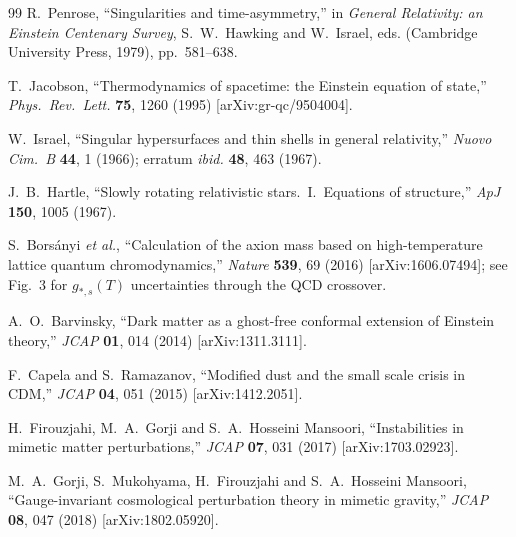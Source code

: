\documentclass[aps,prd,twocolumn,nofootinbib,floatfix,superscriptaddress]{revtex4-2}
\begin{document}
\begin{thebibliography}{99}
 R.~Penrose, ``Singularities and time-asymmetry,''
in \textit{General Relativity: an Einstein Centenary Survey},
S.~W.~Hawking and W.~Israel, eds. (Cambridge University Press, 1979),
pp.~581--638.

 T.~Jacobson, ``Thermodynamics of spacetime:
the Einstein equation of state,''
\textit{Phys.~Rev.~Lett.} \textbf{75}, 1260 (1995)
[arXiv:gr-qc/9504004].

 W.~Israel, ``Singular hypersurfaces and thin
shells in general relativity,''
\textit{Nuovo Cim.~B} \textbf{44}, 1 (1966); erratum
\textit{ibid.} \textbf{48}, 463 (1967).

 J.~B.~Hartle, ``Slowly rotating relativistic
stars.~I.~Equations of structure,''
\textit{ApJ} \textbf{150}, 1005 (1967).

 S.~Bors\'anyi \emph{et al.}, ``Calculation
of the axion mass based on high-temperature lattice quantum
chromodynamics,''
\textit{Nature} \textbf{539}, 69 (2016) [arXiv:1606.07494]; see
Fig.~3 for $g_{*,s}(T)$ uncertainties through the QCD crossover.

 A.~O.~Barvinsky, ``Dark matter as a
ghost-free conformal extension of Einstein theory,''
\textit{JCAP} \textbf{01}, 014 (2014) [arXiv:1311.3111].

 F.~Capela and S.~Ramazanov, ``Modified dust and
the small scale crisis in CDM,''
\textit{JCAP} \textbf{04}, 051 (2015) [arXiv:1412.2051].

 H.~Firouzjahi, M.~A.~Gorji and
S.~A.~Hosseini Mansoori, ``Instabilities in mimetic matter
perturbations,''
\textit{JCAP} \textbf{07}, 031 (2017) [arXiv:1703.02923].

 M.~A.~Gorji, S.~Mukohyama, H.~Firouzjahi and
S.~A.~Hosseini Mansoori, ``Gauge-invariant cosmological perturbation
theory in mimetic gravity,''
\textit{JCAP} \textbf{08}, 047 (2018) [arXiv:1802.05920].

\end{thebibliography}
\end{document}
